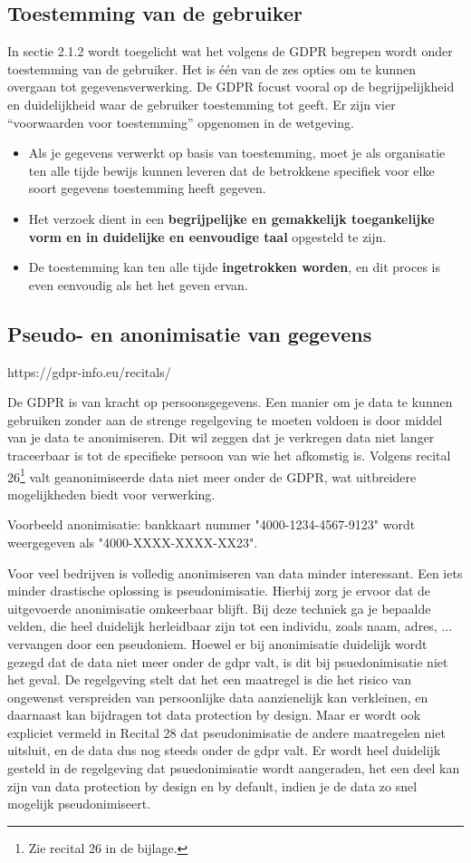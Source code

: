 \subsection{Toestemming van de gebruiker}
In sectie 2.1.2 wordt toegelicht wat het volgens de GDPR begrepen wordt onder toestemming van de gebruiker. Het is één van de zes opties om te kunnen overgaan tot gegevensverwerking. De GDPR focust vooral op de begrijpelijkheid en duidelijkheid waar de gebruiker toestemming tot geeft. Er zijn vier “voorwaarden voor toestemming” opgenomen in de wetgeving. 
\begin{itemize}
    \item  Als je gegevens verwerkt op basis van toestemming, moet je als organisatie ten alle tijde bewijs kunnen leveren dat de betrokkene specifiek voor elke soort gegevens toestemming heeft gegeven. 
    \item  Het verzoek dient in een \textbf{begrijpelijke en gemakkelijk toegankelijke vorm en in duidelijke en eenvoudige taal} opgesteld te zijn. 
    \item  
    De toestemming kan ten alle tijde \textbf{ingetrokken worden}, en dit proces is even eenvoudig als het het geven ervan. 
\end{itemize}


 

\subsection{Pseudo- en anonimisatie van gegevens}
https://gdpr-info.eu/recitals/


De GDPR is van kracht op persoonsgegevens. Een manier om je data te kunnen gebruiken zonder aan de strenge regelgeving te moeten voldoen is door middel van je data te anonimiseren. Dit wil zeggen dat je verkregen data niet langer traceerbaar is tot de specifieke persoon van wie het afkomstig is. Volgens recital 26\footnote{Zie recital 26 in de bijlage.} valt geanonimiseerde data niet meer onder de GDPR, wat uitbreidere mogelijkheden biedt voor verwerking. 

Voorbeeld anonimisatie: bankkaart nummer "4000-1234-4567-9123" wordt weergegeven als "4000-XXXX-XXXX-XX23". 

Voor veel bedrijven is volledig anonimiseren van data minder interessant. Een iets minder drastische oplossing is pseudonimisatie. Hierbij zorg je ervoor dat de uitgevoerde anonimisatie omkeerbaar blijft.  
Bij deze techniek ga je bepaalde velden, die heel duidelijk herleidbaar zijn tot een individu, zoals naam, adres, ... vervangen door een pseudoniem.
Hoewel er bij anonimisatie duidelijk wordt gezegd dat de data niet meer onder de gdpr valt, is dit bij psuedonimisatie niet het geval. De regelgeving stelt dat het een maatregel is die het risico van ongewenst verspreiden van persoonlijke data aanzienelijk kan verkleinen, en daarnaast kan bijdragen tot data protection by design. Maar er wordt ook expliciet vermeld in Recital 28 dat pseudonimisatie de andere maatregelen niet uitsluit, en de data dus nog steeds onder de gdpr valt. 
Er wordt heel duidelijk gesteld in de regelgeving dat psuedonimisatie wordt aangeraden, het een deel kan zijn van data protection by design en by default, indien je de data zo snel mogelijk pseudonimiseert. 

